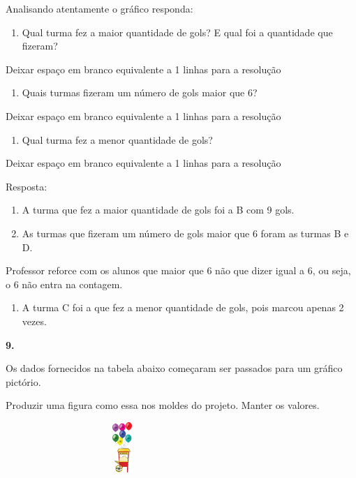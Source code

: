 Analisando atentamente o gráfico responda:

\begin{enumerate}
\def\labelenumi{\alph{enumi})}
\item
  Qual turma fez a maior quantidade de gols? E qual foi a quantidade que
  fizeram?
\end{enumerate}

Deixar espaço em branco equivalente a 1 linhas para a resolução

\begin{enumerate}
\def\labelenumi{\alph{enumi})}
\item
  Quais turmas fizeram um número de gols maior que 6?
\end{enumerate}

Deixar espaço em branco equivalente a 1 linhas para a resolução

\begin{enumerate}
\def\labelenumi{\alph{enumi})}
\item
  Qual turma fez a menor quantidade de gols?
\end{enumerate}

Deixar espaço em branco equivalente a 1 linhas para a resolução

Resposta:

\begin{enumerate}
\def\labelenumi{\alph{enumi})}
\item
  A turma que fez a maior quantidade de gols foi a B com 9 gols.
\item
  As turmas que fizeram um número de gols maior que 6 foram as turmas B
  e D.
\end{enumerate}

Professor reforce com os alunos que maior que 6 não que dizer igual a 6,
ou seja, o 6 não entra na contagem.

\begin{enumerate}
\def\labelenumi{\alph{enumi})}
\item
  A turma C foi a que fez a menor quantidade de gols, pois marcou apenas
  2 vezes.
\end{enumerate}

\textbf{9.}

Os dados fornecidos na tabela abaixo começaram ser passados para um
gráfico pictório.

Produzir uma figura como essa nos moldes do projeto. Manter os valores.

\includegraphics[width=3.47436in,height=0.75022in]{media/image98.png}

